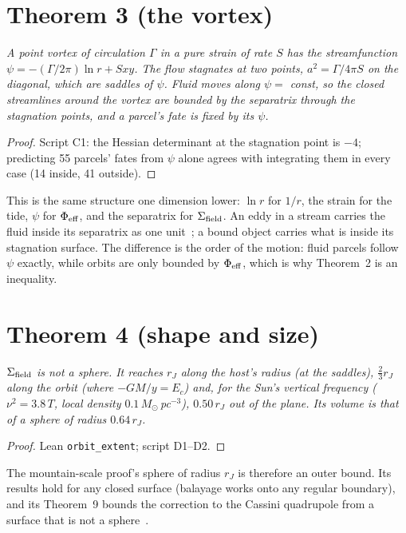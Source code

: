 \documentclass[twocolumn]{iopjournal}
\begin{document}

\section*{Theorem 3 (the vortex)}

\emph{A point vortex of circulation $\Gamma$ in a pure strain of rate
$S$ has the streamfunction $\psi = -(\Gamma/2\pi)\ln r + Sxy$. The flow
stagnates at two points, $a^2 = \Gamma/4\pi S$ on the diagonal, which
are saddles of $\psi$. Fluid moves along $\psi = $ const, so the closed
streamlines around the vortex are bounded by the separatrix through the
stagnation points, and a parcel's fate is fixed by its $\psi$.}

\begin{proof}
Script C1: the Hessian determinant at the stagnation point is $-4$;
predicting 55 parcels' fates from $\psi$ alone agrees with integrating
them in every case (14 inside, 41 outside).
\end{proof}

This is the same structure one dimension lower: $\ln r$ for $1/r$, the
strain for the tide, $\psi$ for $\Phi_{\rm eff}$, and the separatrix for
$\Sigma_{\rm field}$. An eddy in a stream carries the fluid inside its
separatrix as one unit~\cite{Batchelor1956}; a bound object carries what
is inside its stagnation surface. The difference is the order of the
motion: fluid parcels follow $\psi$ exactly, while orbits are only
bounded by $\Phi_{\rm eff}$, which is why Theorem~2 is an inequality.


\section*{Theorem 4 (shape and size)}

\emph{$\Sigma_{\rm field}$ is not a sphere. It reaches $r_J$ along the
host's radius (at the saddles), $\tfrac23r_J$ along the orbit (where
$-GM/y = E_c$) and, for the Sun's vertical frequency ($\nu^2 = 3.8\,T$,
local density $0.1\,M_\odot$\,pc$^{-3}$), $0.50\,r_J$ out of the plane.
Its volume is that of a sphere of radius $0.64\,r_J$.}

\begin{proof}
Lean \texttt{orbit\_extent}; script D1--D2.
\end{proof}

The mountain-scale proof's sphere of radius $r_J$ is therefore an outer
bound. Its results hold for any closed surface (balayage works onto any
regular boundary), and its Theorem~9 bounds the correction to the
Cassini quadrupole from a surface that is not a sphere~\cite{NelsonMS}.
\end{document}
